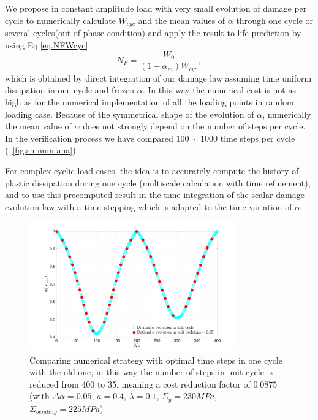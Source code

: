 \documentclass[3p,times,procedia,number]{elsarticle}
\newcommand{\figref}[1]{\figurename~\ref{#1}}
\begin{document}
We propose in constant amplitude load with very small evolution of damage per cycle to numerically calculate $W_{cyc}$ and the mean values of $\alpha$ through one cycle or several cycles(out-of-phase condition) and apply the result to life prediction by using  Eq.\eqref{eq.NFWcyc}:
\begin{equation}
N_F= \dfrac{W_0}{\left( 1-\alpha_m\right) W_{cyc}},
\label{eq.cycNF}
\end{equation}
which is obtained by direct integration of our damage law assuming time uniform dissipation in one cycle and frozen $\alpha$.
In this way the numerical cost is not as high as for the numerical implementation of all the loading points in random loading case. Because of the symmetrical shape of the evolution of $\alpha$, numerically the mean value of $\alpha$ does not strongly depend on the number of steps per cycle. In the verification process we have compared $100\sim1000$ time steps per cycle (\figref{fig.sn-num-ana}). 

For complex cyclic load cases, the idea is to accurately compute the history of plastic dissipation during one cycle (multiscale calculation with time refinement), and to use this precomputed result in the time integration of the scalar damage evolution law with a time stepping which is adapted to the time variation of $\alpha$. 

\begin{figure}[!h]
	\centering
	\includegraphics[width=0.8\textwidth]{figures//alpha_opt_vs_alpha_stepnumber.png} 
	\caption{Comparing numerical strategy with optimal time steps in one cycle with the old one, in this way the number of steps in unit cycle is reduced from 400 to 35, meaning a cost reduction factor of 0.0875 (with $\Delta\alpha=0.05$, $a=0.4$, $\lambda=0.1$, $\Sigma_y=230 MPa$, $\Sigma_{bending}=225 MPa$)}
	\label{fig.alpha_opt_vs_alpha_stepnumber}
\end{figure}
\end{document}
